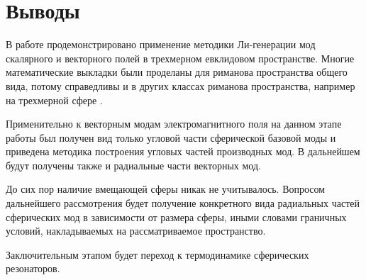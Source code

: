 \documentclass[12pt,a4paper]{article}
\begin{document}
    \section{Выводы}

        В работе продемонстрировано применение методики Ли-генерации мод скалярного и векторного полей в трехмерном евклидовом пространстве. Многие математические выкладки были проделаны для риманова пространства общего вида, потому справедливы и в других классах риманова пространства, например на трехмерной сфере \cite{burlankov_tmf}.

        Применительно к векторным модам электромагнитного поля на данном этапе работы был получен вид только угловой части сферической базовой моды и приведена методика построения угловых частей производных мод. В дальнейшем будут получены также и радиальные части векторных мод.

        До сих пор наличие вмещающей сферы никак не учитывалось. Вопросом дальнейшего рассмотрения будет получение конкретного вида радиальных частей сферических мод в зависимости от размера сферы, иными словами граничных условий, накладываемых на рассматриваемое пространство.

        Заключительным этапом будет переход к термодинамике сферических резонаторов.


    
    
\end{document}
